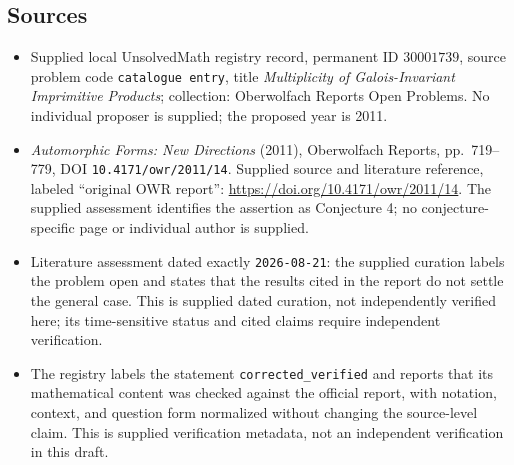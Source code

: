 \documentclass[11pt]{article}
\begin{document}
\subsection{Sources}
\begin{itemize}
\item Supplied local UnsolvedMath registry record, permanent ID \(30001739\), source problem code \texttt{catalogue entry}, title \emph{Multiplicity of Galois-Invariant Imprimitive Products}; collection: Oberwolfach Reports Open Problems. No individual proposer is supplied; the proposed year is 2011.
\item \emph{Automorphic Forms: New Directions} (2011), Oberwolfach Reports, pp.~719--779, DOI \texttt{10.4171/owr/2011/14}. Supplied source and literature reference, labeled ``original OWR report'': \url{https://doi.org/10.4171/owr/2011/14}. The supplied assessment identifies the assertion as Conjecture 4; no conjecture-specific page or individual author is supplied.
\item Literature assessment dated exactly \texttt{2026-08-21}: the supplied curation labels the problem open and states that the results cited in the report do not settle the general case. This is supplied dated curation, not independently verified here; its time-sensitive status and cited claims require independent verification.
\item The registry labels the statement \texttt{corrected\_verified} and reports that its mathematical content was checked against the official report, with notation, context, and question form normalized without changing the source-level claim. This is supplied verification metadata, not an independent verification in this draft.
\end{itemize}
\end{document}
